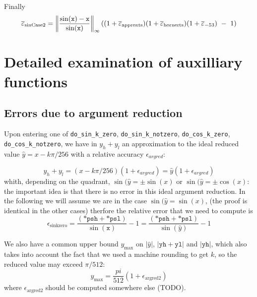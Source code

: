 Finally
\begin{equation}
  \maxeps_{\mathrm{sinCase2}} =  \left\Vert\frac{\sin(\mathtt{x})-\mathtt{x}}{\sin(\mathtt{x})}\right\Vert_{\infty}((1+\maxeps_{\mathrm{approxts}})(1+\maxeps_{\mathrm{hornerts}})(1+\maxeps_{-53})\ -\ 1)
  \label{eq:SinCase2Total2}
\end{equation}
 




\section{Detailed examination of auxilliary functions}

\subsection{Errors due to argument reduction}
Upon entering one of \texttt{do\_sin\_k\_zero}, \texttt{do\_sin\_k\_notzero},
\texttt{do\_cos\_k\_zero}, \texttt{do\_cos\_k\_notzero}, we have in
$y_h+y_l$ an approximation to the ideal reduced value
$\hat{y}=x-k\pi/256$ with a relative accuracy $\epsilon_{argred}$:

\begin{equation}
  y_h+y_l = (x-k\pi/256)(1+\epsilon_{argred}) = \hat{y}(1+\epsilon_{argred})
  \label{eq:sinargrederror1}
\end{equation}
whith, depending on the quadrant, $\sin(\hat{y} = \pm\sin(x)$ or
$\sin(\hat{y} = \pm\cos(x)$: the important idea is that there is no
error in this ideal argument reduction. In the following we will
assume we are in the case $\sin(\hat{y} = \sin(x)$, (the proof is
identical in the other cases) therfore the relative error that we need
to compute is
\begin{equation}
  \epsilon_{\mathrm{sinkzero}} = \frac{(\mathtt{*psh} + \mathtt{*psl})}{\sin(\mathtt{x})} -1 = \frac{(\mathtt{*psh} + \mathtt{*psl})}{\sin(\hat{y})} -1
\end{equation}

We also have a common upper bound $y_{\max}$ on $|\hat{y}|$,
$|\mathtt{yh}+\mathtt{yl}|$ and $|\mathtt{yh}|$, which also takes into
account the fact that we used a machine rounding to get $k$, so the
reduced value may exceed $\pi/512$:
\begin{equation}
  y_{\max} = \frac{pi}{512}(1+\epsilon_{\mathrm{argred2}})
  \label{eq:ymaxsink0}  
\end{equation}
where $\epsilon_{\mathrm{argred2}}$ should be computed somewhere else (TODO).


